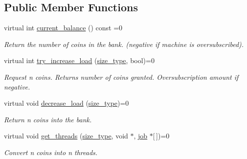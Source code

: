 \subsection*{Public Member Functions}
\begin{DoxyCompactItemize}
\item 
\hypertarget{class____kmp_1_1rml_1_1omp__server_a09afe890ace0fd68aef904d3a2177a2b}{}virtual int \hyperlink{class____kmp_1_1rml_1_1omp__server_a09afe890ace0fd68aef904d3a2177a2b}{current\+\_\+balance} () const  =0\label{class____kmp_1_1rml_1_1omp__server_a09afe890ace0fd68aef904d3a2177a2b}

\begin{DoxyCompactList}\small\item\em Return the number of coins in the bank. (negative if machine is oversubscribed). \end{DoxyCompactList}\item 
virtual int \hyperlink{class____kmp_1_1rml_1_1omp__server_acc039131c85db996a1e83fb43e061da1}{try\+\_\+increase\+\_\+load} (\hyperlink{class____kmp_1_1rml_1_1omp__server_a57f7e7cc71ec562fcb379da256cdffb0}{size\+\_\+type}, bool)=0
\begin{DoxyCompactList}\small\item\em Request n coins. Returns number of coins granted. Oversubscription amount if negative. \end{DoxyCompactList}\item 
\hypertarget{class____kmp_1_1rml_1_1omp__server_a193f20e658a19979377af2bfcb544a2b}{}virtual void \hyperlink{class____kmp_1_1rml_1_1omp__server_a193f20e658a19979377af2bfcb544a2b}{decrease\+\_\+load} (\hyperlink{class____kmp_1_1rml_1_1omp__server_a57f7e7cc71ec562fcb379da256cdffb0}{size\+\_\+type})=0\label{class____kmp_1_1rml_1_1omp__server_a193f20e658a19979377af2bfcb544a2b}

\begin{DoxyCompactList}\small\item\em Return n coins into the bank. \end{DoxyCompactList}\item 
virtual void \hyperlink{class____kmp_1_1rml_1_1omp__server_a7ab8dbd3c94a50c907b2aba731c438a8}{get\+\_\+threads} (\hyperlink{class____kmp_1_1rml_1_1omp__server_a57f7e7cc71ec562fcb379da256cdffb0}{size\+\_\+type}, void $\ast$, \hyperlink{classrml_1_1server_ac812e52a5bb3de275e624c36997eac0e}{job} $\ast$\mbox{[}$\,$\mbox{]})=0
\begin{DoxyCompactList}\small\item\em Convert n coins into n threads. \end{DoxyCompactList}\end{DoxyCompactItemize}

